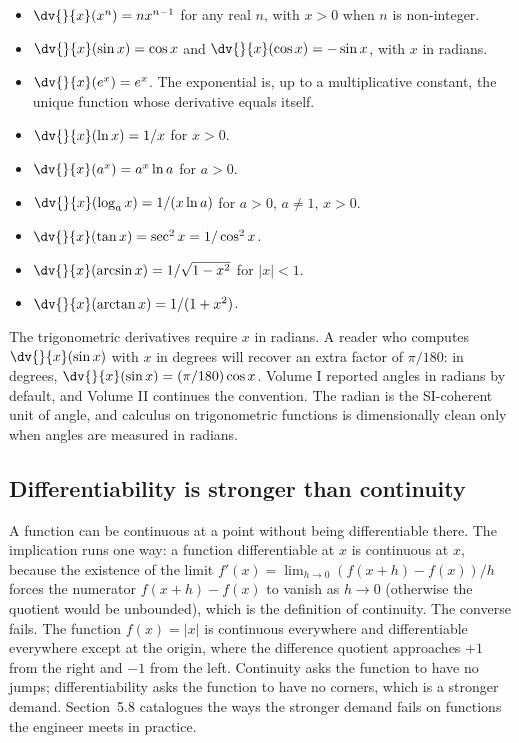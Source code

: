 \begin{itemize}[leftmargin=*]
  \item $\dv{}{x}(x^{n}) = n x^{n - 1}$ for any real $n$, with
    $x > 0$ when $n$ is non-integer.
  \item $\dv{}{x}(\sin x) = \cos x$ and $\dv{}{x}(\cos x) = -\sin
    x$, with $x$ in radians.
  \item $\dv{}{x}(e^{x}) = e^{x}$. The exponential is, up to a
    multiplicative constant, the unique function whose derivative
    equals itself.
  \item $\dv{}{x}(\ln x) = 1/x$ for $x > 0$.
  \item $\dv{}{x}(a^{x}) = a^{x} \ln a$ for $a > 0$.
  \item $\dv{}{x}(\log_{a} x) = 1/(x \ln a)$ for $a > 0$, $a \neq
    1$, $x > 0$.
  \item $\dv{}{x}(\tan x) = \sec^{2} x = 1 / \cos^{2} x$.
  \item $\dv{}{x}(\arcsin x) = 1/\sqrt{1 - x^{2}}$ for $|x| < 1$.
  \item $\dv{}{x}(\arctan x) = 1/(1 + x^{2})$.
\end{itemize}

The trigonometric derivatives require $x$ in radians. A reader who
computes $\dv{}{x}(\sin x)$ with $x$ in degrees will recover an
extra factor of $\pi / 180$: in degrees, $\dv{}{x}(\sin x) =
(\pi / 180) \cos x$. Volume I reported angles in radians by
default, and Volume II continues the convention. The radian is the
SI-coherent unit of angle, and calculus on trigonometric functions
is dimensionally clean only when angles are measured in radians.

\subsection{Differentiability is stronger than continuity}

A function can be continuous at a point without being
differentiable there. The implication runs one way: a function
differentiable at $x$ is continuous at $x$, because the existence
of the limit $f'(x) = \lim_{h \to 0} (f(x + h) - f(x))/h$ forces
the numerator $f(x + h) - f(x)$ to vanish as $h \to 0$ (otherwise
the quotient would be unbounded), which is the definition of
continuity. The converse fails. The function $f(x) = |x|$ is
continuous everywhere and differentiable everywhere except at the
origin, where the difference quotient approaches $+1$ from the
right and $-1$ from the left. Continuity asks the function to have
no jumps; differentiability asks the function to have no corners,
which is a stronger demand. Section~5.8 catalogues the ways the
stronger demand fails on functions the engineer meets in practice.

